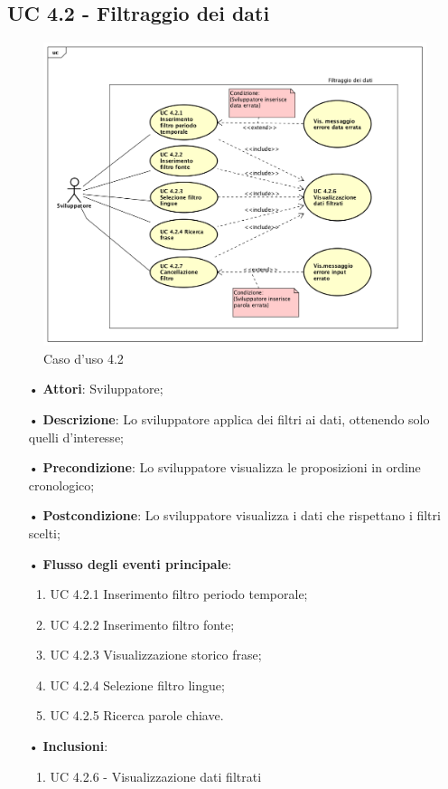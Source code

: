 \subsection{UC 4.2 - Filtraggio dei dati}
\begin{figure}[H]
\centering
\includegraphics[width=17cm]{img/UC420.png} 
\caption{Caso d'uso 4.2}\label{fig:420}
\end{figure}
\begin{itemize}
\item[•]\textbf{Attori}: Sviluppatore;
\item[•]\textbf{Descrizione}: Lo sviluppatore applica dei filtri ai dati, ottenendo solo quelli d'interesse;
\item[•]\textbf{Precondizione}: Lo sviluppatore visualizza le proposizioni in ordine cronologico;
\item[•]\textbf{Postcondizione}: Lo sviluppatore visualizza i dati che rispettano i filtri scelti;
\item[•]\textbf{Flusso degli eventi principale}:
\begin{enumerate}
\item UC 4.2.1 Inserimento filtro periodo temporale;
\item UC 4.2.2 Inserimento filtro fonte;
\item UC 4.2.3 Visualizzazione storico frase;
\item UC 4.2.4 Selezione filtro lingue;
\item UC 4.2.5 Ricerca parole chiave.
\end{enumerate}
\item[•]\textbf{Inclusioni}:
\begin{enumerate}
\item UC 4.2.6 - Visualizzazione dati filtrati
\end{enumerate}
\end{itemize}
